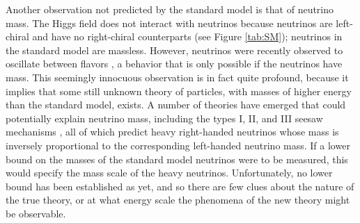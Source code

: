 Another observation not predicted by the standard model is that of neutrino mass.  The Higgs field does not interact with neutrinos because neutrinos are left-chiral and have no right-chiral counterparts (see Figure \ref{tab:SM}); neutrinos in the standard model are massless. However, neutrinos were recently observed to oscillate between flavors \cite{Fukuda:1998mi}, a behavior that is only possible if the neutrinos have mass. This seemingly innocuous observation is in fact quite profound, because it implies that some still unknown theory of particles, with masses of higher energy than the standard model, exists. A number of theories have emerged that could potentially explain neutrino mass, including the types I, II, and III seesaw mechanisms \cite{Yanagida:1980xy}, all of which predict heavy right-handed neutrinos whose mass is inversely proportional to the corresponding left-handed neutrino mass. If a lower bound on the masses of the standard model neutrinos were to be measured, this would specify the mass scale of the heavy neutrinos. Unfortunately, no lower bound has been established as yet, and so there are few clues about the nature of the true theory, or at what energy scale the phenomena of the new theory might be observable.

